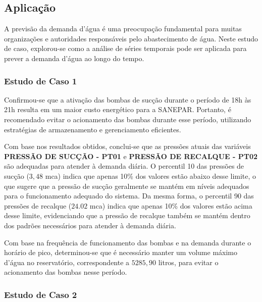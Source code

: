 \subsection{Aplica\c c\~ao}\label{subsec:estudo-reslt}


A previsão da demanda d'água é uma preocupação fundamental para muitas organizações e autoridades responsáveis pelo abastecimento de água. Neste estudo de caso, explorou-se como a análise de séries temporais pode ser aplicada para prever a demanda d'água ao longo do tempo.



\subsubsection{Estudo de Caso 1}\label{subsubsec:quest-est}



Confirmou-se que a ativação das bombas de sucção durante o período de 18h às 21h resulta em um maior custo energético para a SANEPAR. Portanto, é recomendado evitar o acionamento das bombas durante esse período, utilizando estratégias de armazenamento e gerenciamento eficientes.





Com base nos resultados obtidos, conclui-se que as pressões atuais das variáveis \textbf{PRESSÃO DE SUCÇÃO - PT01} e \textbf{PRESSÃO DE RECALQUE - PT02} são adequadas para atender à demanda diária. O percentil 10 das pressões de sucção ($3,48$ mca) indica que apenas 10\% dos valores estão abaixo desse limite, o que sugere que a pressão de sucção geralmente se mantém em níveis adequados para o funcionamento adequado do sistema. Da mesma forma, o percentil 90 das pressões de recalque ($24.02$ mca) indica que apenas 10\% dos valores estão acima desse limite, evidenciando que a pressão de recalque também se mantém dentro dos padrões necessários para atender à demanda diária.


Com base na frequência de funcionamento das bombas e na demanda durante o horário de pico, determinou-se que é necessário manter um volume máximo d'água no reservatório, correspondente a $5285,90$ litros, para evitar o acionamento das bombas nesse período.



\subsubsection{Estudo de Caso 2}

